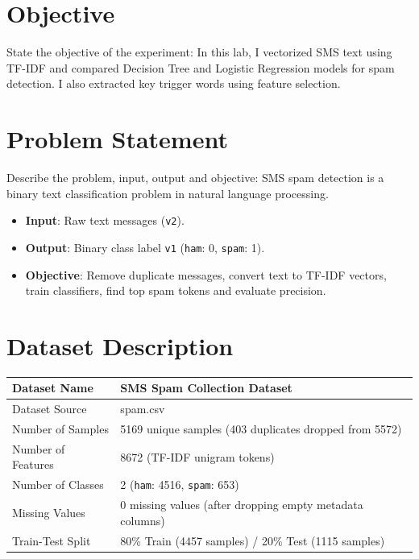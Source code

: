 \documentclass[12pt,a4paper]{article}
\begin{document}
\section{Objective}
State the objective of the experiment:
In this lab, I vectorized SMS text using TF-IDF and compared Decision Tree and Logistic Regression models for spam detection. I also extracted key trigger words using feature selection.

\section{Problem Statement}
Describe the problem, input, output and objective:
SMS spam detection is a binary text classification problem in natural language processing.
\begin{itemize}
\item \textbf{Input}: Raw text messages (\texttt{v2}).
\item \textbf{Output}: Binary class label \texttt{v1} (\texttt{ham}: 0, \texttt{spam}: 1).
\item \textbf{Objective}: Remove duplicate messages, convert text to TF-IDF vectors, train classifiers, find top spam tokens and evaluate precision.
\end{itemize}

\section{Dataset Description}
\begin{longtable}{|p{6cm}|p{8cm}|}
\hline
Dataset Name & SMS Spam Collection Dataset \\ \hline
Dataset Source & spam.csv \\ \hline
Number of Samples & 5169 unique samples (403 duplicates dropped from 5572) \\ \hline
Number of Features & 8672 (TF-IDF unigram tokens) \\ \hline
Number of Classes & 2 (\texttt{ham}: 4516, \texttt{spam}: 653) \\ \hline
Missing Values & 0 missing values (after dropping empty metadata columns) \\ \hline
Train-Test Split & 80\% Train (4457 samples) / 20\% Test (1115 samples) \\ \hline
\end{longtable}
\end{document}
